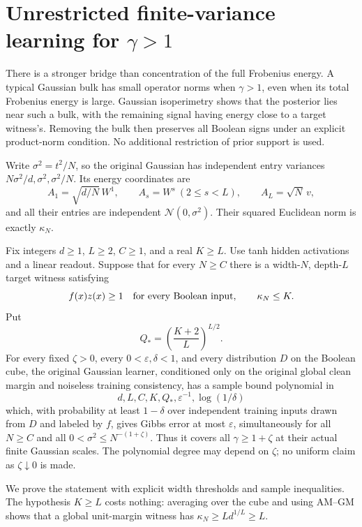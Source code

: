 \section{Unrestricted finite-variance learning for \texorpdfstring{$\gamma>1$}{gamma greater than one}}
\label{sec:gaussian-distance}

There is a stronger bridge than concentration of the full Frobenius energy.
A typical Gaussian bulk has small operator norms when $\gamma>1$, even when
its total Frobenius energy is large. Gaussian isoperimetry shows that the
posterior lies near such a bulk, with the remaining signal having energy
close to a target witness's. Removing the bulk then preserves all Boolean
signs under an explicit product-norm condition. No additional restriction of prior
support is used.

Write $\sigma^2=t^2/N$, so the original Gaussian has independent entry
variances $N\sigma^2/d,\sigma^2,\sigma^2/N$. Its energy coordinates are
\[
 A_1=\sqrt{d/N}\,W^1,\qquad A_s=W^s\ (2\le s<L),
 \qquad A_L=\sqrt N\,v,
\]
and all their entries are independent $\mathcal N(0,\sigma^2)$.
Their squared Euclidean norm is exactly $\kappa_N$.

\begin{theorem}
\label{thm:unrestricted-above-one}
Fix integers $d\ge1$, $L\ge2$, $C\ge1$, and a real $K\ge L$.
Use tanh hidden activations and a linear readout. Suppose that for every
$N\ge C$ there is a width-$N$, depth-$L$ target witness satisfying
\[
 f(x)z(x)\ge1\quad\hbox{for every Boolean input},\qquad \kappa_N\le K.
\]
Put
\[
 Q_* = \left(\frac{K+2}{L}\right)^{L/2}.
\]
For every fixed $\zeta>0$, every $0<\varepsilon,\delta<1$, and every
distribution $D$ on the Boolean cube, the original Gaussian learner, conditioned only
on the original global clean margin and noiseless training consistency,
has a sample bound polynomial in
\[
 d,L,C,K,Q_*,\varepsilon^{-1},\log(1/\delta)
\]
which, with probability at least $1-\delta$ over independent training
inputs drawn from $D$ and labeled by $f$, gives Gibbs error at most
$\varepsilon$, simultaneously for all
$N\ge C$ and all $0<\sigma^2\le N^{-(1+\zeta)}$.
Thus it covers all $\gamma\ge1+\zeta$ at their actual finite Gaussian scales.
The polynomial degree may depend on $\zeta$; no uniform claim as
$\zeta\downarrow0$ is made.
\end{theorem}

We prove the statement with explicit width thresholds and sample inequalities.
The hypothesis $K\ge L$ costs nothing: averaging over the cube and using
AM--GM shows that a global unit-margin witness has
$\kappa_N\ge Ld^{1/L}\ge L$.

